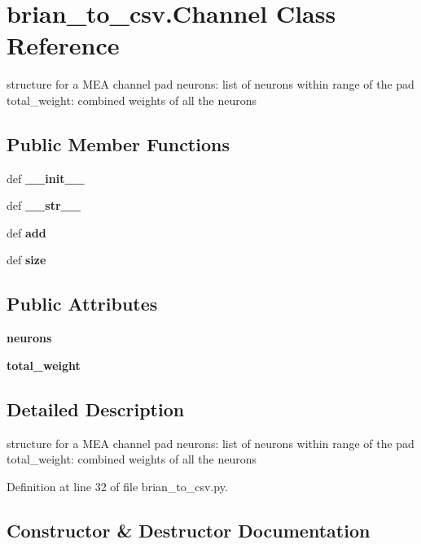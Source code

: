 \section{brian\-\_\-to\-\_\-csv.\-Channel \-Class \-Reference}
\label{classbrian__to__csv_1_1Channel}


structure for a \-M\-E\-A channel pad neurons\-: list of neurons within range of the pad total\-\_\-weight\-: combined weights of all the neurons  


\subsection*{\-Public \-Member \-Functions}
\begin{DoxyCompactItemize}
\item 
def {\bf \-\_\-\-\_\-init\-\_\-\-\_\-}
\item 
def {\bf \-\_\-\-\_\-str\-\_\-\-\_\-}
\item 
def {\bf add}
\item 
def {\bf size}
\end{DoxyCompactItemize}
\subsection*{\-Public \-Attributes}
\begin{DoxyCompactItemize}
\item 
{\bf neurons}
\item 
{\bf total\-\_\-weight}
\end{DoxyCompactItemize}


\subsection{\-Detailed \-Description}
structure for a \-M\-E\-A channel pad neurons\-: list of neurons within range of the pad total\-\_\-weight\-: combined weights of all the neurons 

\-Definition at line 32 of file brian\-\_\-to\-\_\-csv.\-py.



\subsection{\-Constructor \& \-Destructor \-Documentation}
